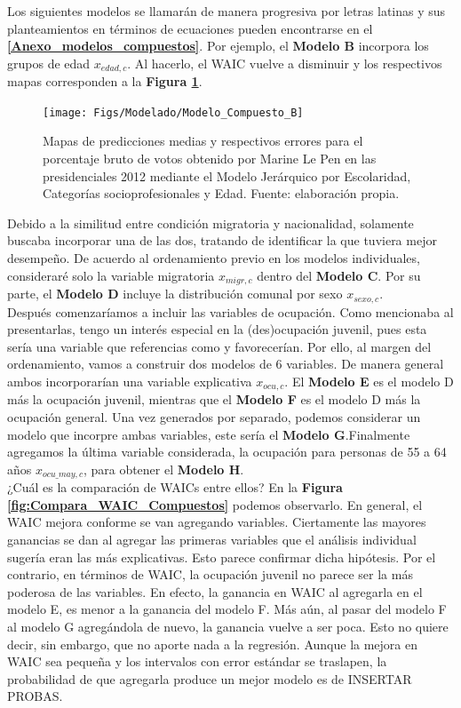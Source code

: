 Los siguientes modelos se llamarán de manera progresiva por letras latinas y sus planteamientos en términos de ecuaciones pueden encontrarse en el \textbf{\autoref{Anexo_modelos_compuestos}}. Por ejemplo, el \textbf{Modelo B} incorpora los grupos de edad $x_{edad,c}$. Al hacerlo, el WAIC vuelve a disminuir y los respectivos mapas corresponden a la \textbf{Figura \ref{fig:Modelo_Compuesto_B}}.\\ 

\begin{figure}[h]
	\centering
	\texttt{[image: Figs/Modelado/Modelo\_Compuesto\_B]}
	\caption{Mapas de predicciones medias y respectivos errores para el porcentaje bruto de votos obtenido por Marine Le Pen en las presidenciales 2012 mediante el Modelo Jerárquico por Escolaridad, Categorías socioprofesionales y Edad. Fuente: elaboración propia.}
	\label{fig:Modelo_Compuesto_B}
\end{figure}

Debido a la similitud entre condición migratoria y nacionalidad, solamente buscaba incorporar una de las dos, tratando de identificar la que tuviera mejor desempeño. De acuerdo al ordenamiento previo en los modelos individuales, consideraré solo la variable migratoria $x_{migr,c}$ dentro del \textbf{Modelo C}. Por su parte, el \textbf{Modelo D} incluye la distribución comunal por sexo $x_{sexo,c}$.\\

Después comenzaríamos a incluir las variables de ocupación. Como mencionaba al presentarlas, tengo un interés especial en la (des)ocupación juvenil, pues esta sería una variable que referencias como \textcite{LeBras16} y \textcite{Perrineau07} favorecerían. Por ello, al margen del ordenamiento, vamos a construir dos modelos de 6 variables. De manera general ambos incorporarían una variable explicativa $x_{ocu,c}$. El \textbf{Modelo E} es el modelo D más la ocupación juvenil, mientras que el \textbf{Modelo F} es el modelo D más la ocupación general. Una vez generados por separado, podemos considerar un modelo que incorpre ambas variables, este sería el \textbf{Modelo G}.Finalmente agregamos la última variable considerada, la ocupación para personas de 55 a 64 años $x_{ocu\_may,c}$, para obtener el \textbf{Modelo H}.\\

¿Cuál es la comparación de WAICs entre ellos? En la \textbf{Figura \ref{fig:Compara_WAIC_Compuestos}} podemos observarlo. En general, el WAIC mejora conforme se van agregando variables. Ciertamente las mayores ganancias se dan al agregar las primeras variables que el análisis individual sugería eran las más explicativas. Esto parece confirmar dicha hipótesis. Por el contrario, en términos de WAIC, la ocupación juvenil no parece ser la más poderosa de las variables. En efecto, la ganancia en WAIC al agregarla en el modelo E, es menor a la ganancia del modelo F. Más aún, al pasar del modelo F al modelo G agregándola de nuevo, la ganancia vuelve a ser poca. {\color{Red}Esto no quiere decir, sin embargo, que no aporte nada a la regresión. Aunque la mejora en WAIC sea pequeña y los intervalos con error estándar se traslapen, la probabilidad de que agregarla produce un mejor modelo es de INSERTAR PROBAS.}

